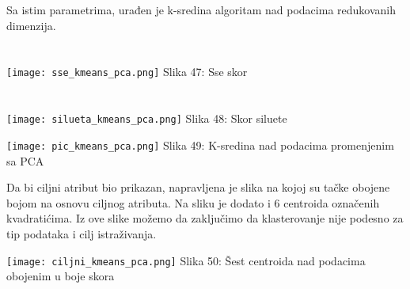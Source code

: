 \documentclass[a4paper]{article}
\begin{document}
{\noindent\begin{minipage}{0.4\textwidth}
Sa istim parametrima, urađen je k-sredina algoritam nad podacima redukovanih dimenzija.\\
\vphantom{a}\\
\vphantom{a}\\
\texttt{[image: sse\_kmeans\_pca.png]}
\hphantom{aaaaaaaaa}Slika 47: Sse skor\\
\vphantom{a}\\
\vphantom{a}\\
\texttt{[image: silueta\_kmeans\_pca.png]}
\hphantom{aaaaaaaa}Slika 48: Skor siluete\\
\end{minipage}
\noindent\begin{minipage}{0.05\textwidth}
\hphantom{a}
\end{minipage}
\noindent\begin{minipage}{0.48\textwidth}
\texttt{[image: pic\_kmeans\_pca.png]}
Slika 49: K-sredina nad podacima promenjenim sa PCA\\
\end{minipage}

\noindent\begin{minipage}{0.45\textwidth}
Da bi ciljni atribut bio prikazan, napravljena je slika na kojoj su tačke obojene bojom na osnovu ciljnog atributa. Na sliku je dodato i 6 centroida označenih kvadratićima. Iz ove slike možemo da zaključimo da klasterovanje nije podesno za tip podataka i cilj istraživanja. \\
\end{minipage}
\noindent\begin{minipage}{0.01\textwidth}
\hphantom{a}
\end{minipage}
\noindent\begin{minipage}{0.6\textwidth}
\texttt{[image: ciljni\_kmeans\_pca.png]}
Slika 50: Šest centroida nad podacima obojenim u boje skora\\
\end{minipage}

}
\end{document}
